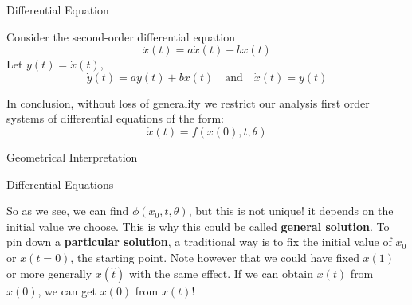 \documentclass[aspectratio=169, handout]{beamer}
\begin{document}
\begin{frame}{Differential Equation}
    \begin{example}
        Consider the second-order differential equation
        \[\ddot{x}(t)=a \dot{x}(t)+bx(t)\]
        Let \(y(t)=\dot{x}(t)\),
        \[\dot{y}(t)=a y(t)+bx(t)\quad \text{and}\quad \dot{x}(t)=y(t)\]
    \end{example}
    
    In conclusion, without loss of generality we restrict our analysis first order systems of differential equations of the form: \[\dot{x}(t)=f(x(0),t,\theta)\]
    
\end{frame}

\begin{frame}{Geometrical Interpretation}
    \begin{center}
    \end{center}
\end{frame}

\begin{frame}{Differential Equations}

So as we see, we can find $\phi(x_0,t,\theta)$, but this is not unique! it depends on the initial value we choose. This is why this could be called \textbf{general solution}. To pin down a \textbf{particular solution}, a traditional way is to fix the initial value of $x_0$ or $x(t=0)$, the starting point. Note however that we could have fixed $x(1)$ or more generally $x(\hat{t})$ with the same effect. If we can obtain $x(t)$ from $x(0)$, we can get $x(0)$ from $x(t)$!
    
\end{frame}
\end{document}
